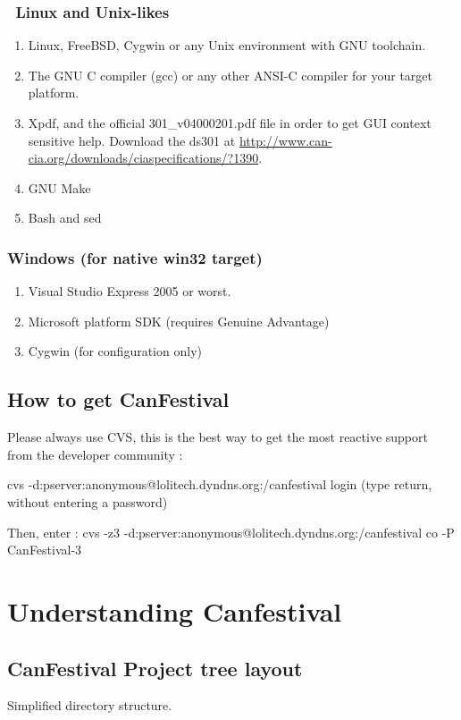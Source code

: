 \documentclass[12pt,twoside]{article}
\newcommand\liststyleLv{%
\renewcommand\labelitemi{{--}}
\renewcommand\labelitemii{{--}}
\renewcommand\labelitemiii{{--}}
\renewcommand\labelitemiv{{--}}
}
\begin{document}
\subsubsection[\ Linux and Unix{}-likes]{\ Linux and Unix{}-likes}
\liststyleLv
\begin{enumerate}
\item Linux, FreeBSD, Cygwin or any Unix environment with GNU toolchain.
\item The GNU C compiler (gcc) or any other ANSI{}-C compiler for your
target platform.
\item Xpdf, and the official 301\_v04000201.pdf file in order to get GUI
context sensitive help. Download the ds301 at
\href{http://www.can-cia.org/downloads/ciaspecifications/?1390}{http://www.can{}-cia.org/downloads/ciaspecifications/?1390}.
\item GNU Make
\item Bash and sed
\end{enumerate}
\subsubsection{Windows (for native win32 target)}
\liststyleLv
\begin{enumerate}
\item Visual Studio Express 2005 or worst.
\item Microsoft platform SDK (requires Genuine Advantage)
\item Cygwin (for configuration only)
\end{enumerate}
\subsection{How to get CanFestival}
Please always use CVS, this is the best way to get the most reactive
support from the developer community :

cvs {}-d:pserver:anonymous@lolitech.dyndns.org:/canfestival
login\newline
(type return, without entering a password) 

Then, enter : \newline
cvs {}-z3 {}-d:pserver:anonymous@lolitech.dyndns.org:/canfestival co
{}-P CanFestival{}-3

\section{Understanding Canfestival}
\subsection{CanFestival Project tree layout}
Simplified directory structure.
\end{document}

